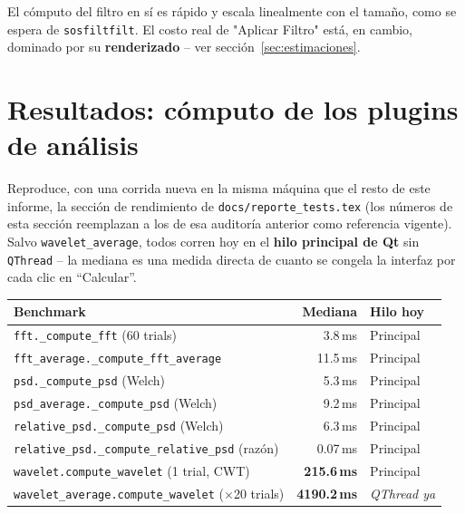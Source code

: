 \documentclass[11pt,a4paper]{article}
\begin{document}
El cómputo del filtro en sí es rápido y escala linealmente con el tamaño, como se espera de
\texttt{sosfiltfilt}. El costo real de "Aplicar Filtro" está, en cambio, dominado por su \textbf{renderizado}
-- ver sección~\ref{sec:estimaciones}.

\newpage
\section{Resultados: cómputo de los plugins de análisis}

Reproduce, con una corrida nueva en la misma máquina que el resto de este informe, la sección de rendimiento
de \texttt{docs/reporte\_\allowbreak tests.tex} (los números de esta sección reemplazan a los de esa
auditoría anterior como referencia vigente). Salvo \texttt{wavelet\_\allowbreak average}, todos
corren hoy en el \textbf{hilo principal de Qt} sin \texttt{QThread} -- la mediana es una medida directa de
cuanto se congela la interfaz por cada clic en ``Calcular''.

\begin{center}
\begin{tabular}{lrl}
\toprule
\textbf{Benchmark} & \textbf{Mediana} & \textbf{Hilo hoy} \\
\midrule
\texttt{fft.\_\allowbreak compute\_\allowbreak fft} (60 trials) & 3.8\,ms & Principal \\
\texttt{fft\_\allowbreak average.\_\allowbreak compute\_\allowbreak fft\_\allowbreak average} & 11.5\,ms & Principal \\
\texttt{psd.\_\allowbreak compute\_\allowbreak psd} (Welch) & 5.3\,ms & Principal \\
\texttt{psd\_\allowbreak average.\_\allowbreak compute\_\allowbreak psd} (Welch) & 9.2\,ms & Principal \\
\texttt{relative\_\allowbreak psd.\_\allowbreak compute\_\allowbreak psd} (Welch) & 6.3\,ms & Principal \\
\texttt{relative\_\allowbreak psd.\_\allowbreak compute\_\allowbreak relative\_\allowbreak psd} (razón) & 0.07\,ms & Principal \\
\texttt{wavelet.compute\_\allowbreak wavelet} (1 trial, CWT) & \textbf{215.6\,ms} & Principal \\
\texttt{wavelet\_\allowbreak average.compute\_\allowbreak wavelet} ($\times$20 trials) & \textbf{4190.2\,ms} & \textit{QThread ya} \\
\bottomrule
\end{tabular}
\end{center}
\end{document}
